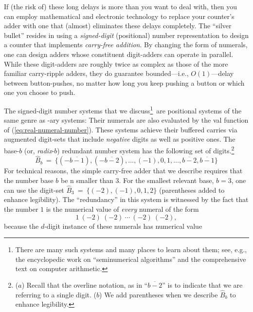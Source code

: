 If (the risk of) these long delays is more than you want to deal with,
then you can employ mathematical and electronic technology to replace
your counter's adder with one that (almost) eliminates these delays
completely.  The ``silver bullet'' resides in using a {\em
  signed-digit} (positional) number representation
to design a counter that implements {\it carry-free addition}.
 By changing the form of numerals, one can
design adders whose constituent digit-adders can operate in parallel.
While these digit-adders are roughly twice as complex as those of the
more familiar carry-ripple adders, they do guarantee bounded---i.e.,
$O(1)$---delay between button-pushes, no matter how long you keep
pushing a button or which one you choose to push.

The signed-digit number systems that we discuss\footnote{There are
  many such systems and many places to learn about them; see, e.g.,
  the encyclopedic work \cite{Knuth69} on ``seminumerical algorithms''
  and the comprehensive text \cite{Hwang79} on computer
  arithmetic.}~are positional systems of the same genre as -ary
systems: Their numerals are also evaluated by the {\sc val} function
of (\ref{eq:real-numeral-number}).  These systems achieve their
buffered carries via augmented digit-sets that include {\em negative}
digits as well as positive ones.  The base-$b$ (or, {\it radix}-$b$)
redundant number system 
 has the following set of
digits.\footnote{($a$) Recall that the overline notation, as in
  ``$\overline{b-2}$'' is to indicate that we are referring to a
  single digit.  ($b$) We add parentheses when we describe
  $\widehat{B}_b$ to enhance legibility.}
\[ \widehat{B}_b \ = \ \{(-\overline{b-1}), (-\overline{b-2}), \ldots,
(-1), 0 , 1, \ldots, \overline{b-2}, \overline{b-1}\}
\]
For technical reasons, the simple carry-free adder that we describe
requires that the number base $b$ be n smaller than $3$.  For the
smallest relevant base, $b=3$, one can use the digit-set
$\widehat{B}_3 \ = \ \{ (-2), (-1), 0, 1, 2\}$ (parentheses added to
enhance legibility).  The ``redundancy'' in this system is witnessed
by the fact that the number $1$ is the numerical value of {\em every}
numeral of the form
\[ 1 \ (-2) \ (-2) \ \cdots \ (-2) \ (-2), \]
because the $d$-digit instance of these numerals has numerical value

\smallskip

